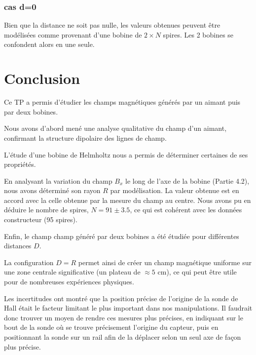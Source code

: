 \documentclass[a4paper,9pt,french]{scrartcl}
\begin{document}
\subsubsection{cas d=0}
Bien que la distance ne soit pas nulle, les valeurs obtenues peuvent \^etre modélisées comme provenant d'une bobine de \(2\times N\) spires. Les 2 bobines se confondent alors en une seule.
\section{Conclusion}
Ce TP a permis d'étudier les champs magnétiques générés par un aimant puis par deux bobines.

Nous avons d'abord mené une analyse qualitative du champ d'un aimant, confirmant la structure dipolaire des lignes de champ.

L'étude d'une bobine de Helmholtz nous a permis de déterminer certaines de ses propriétés.

En analysant la variation du champ $B_x$ le long de l'axe de la bobine (Partie 4.2), nous avons déterminé son rayon $R$ par modélisation. La valeur obtenue est en accord avec la celle obtenue par la mesure du champ au centre. Nous avons pu en déduire le nombre de spires, $N = 91 \pm 3.5$, ce qui est cohérent avec les données constructeur (95 spires).

Enfin, le champ champ généré par deux bobines a été étudiée pour différentes distances $D$.

La configuration $D=R$ permet ainsi de créer un champ magnétique uniforme sur une zone centrale significative (un plateau de $\approx 5$ cm), ce qui peut \^etre utile pour de nombreuses expériences physiques.


Les incertitudes ont montré que la position précise de l'origine de la sonde de Hall était le facteur limitant le plus important dans nos manipulations. Il faudrait donc trouver un moyen de rendre ces mesures plus précises, en indiquant sur le bout de la sonde où se trouve précisement l'origine du capteur, puis en positionnant la sonde sur un rail afin de la déplacer selon un seul axe de façon plus précise.
\end{document}
